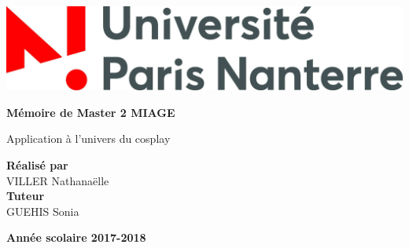 \documentclass[a4paper,12pt]{article}
\begin{document}
\begin{titlepage}
		\newpage
		\thispagestyle{empty}
		\begin{center}
			\includegraphics[scale=0.15]{images/logo_fac}	
		\end{center}
		\begin{center}
			\vspace{0.3cm}
			\large  
			\textbf{Mémoire de Master 2 MIAGE}\\
			\vspace{0.7cm} \large 
			\vskip 0.2in
		\end{center}
		\begin{center}
		    Application à l’univers du cosplay
		\end{center}
		
		\begin{flushleft}
			\begin{center}
			
					\textbf{Réalisé par} \\
					\hspace{0.1cm} VILLER Nathanaëlle \\
					\textbf{Tuteur}\\
				 \hspace{0.1cm} GUEHIS Sonia \\
			
			\end{center}
		\end{flushleft}
	
		\begin{center}
			\vspace{0.1cm} \textbf{Année scolaire 2017-2018}
		\end{center}
		
 
\newpage
\tableofcontents
\thispagestyle{empty}
\end{titlepage}
\end{document}
